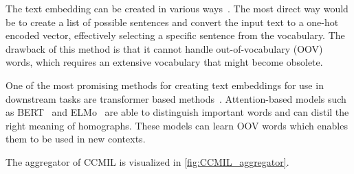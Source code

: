 The text embedding can be created in various ways~\cite{Khattak2019}.
The most direct way would be to create a list of possible sentences and convert the input text to a one-hot encoded vector, effectively selecting a specific sentence from the vocabulary.
The drawback of this method is that it cannot handle out-of-vocabulary (OOV) words, which requires an extensive vocabulary that might become obsolete.

One of the most promising methods for creating text embeddings for use in downstream tasks are transformer based methods~\cite{Vaswani2017}.
Attention-based models such as BERT~\cite{Devlin2018} and ELMo~\cite{Peters2018} are able to distinguish important words and can distil the right meaning of homographs.
These models can learn OOV words which enables them to be used in new contexts.

The aggregator of CCMIL is visualized in \cref{fig:CCMIL_aggregator}.

\begin{figure*}
    \centering
    
    \caption[Clinical Context Multi-Instance Learning aggregator.]{
            Clinical Context Multi-Instance Learning (CCMIL) aggregator.
            Just like in Variance MIL (VarMIL), tile features are presented to a multi-layer perceptron (MLP) to learn attention weights per tile.
            The attention weights are multiplied with their corresponding tile features to get attention-weighted tile features.
            From these, the mean $\mu$ and variance $\sigma^2$ are calculated and concatenated.
            Extending VarMIL, CCMIL further concatenates a text embedding that may contain clinical context of the input image.
            The aggregate is further processed in another MLP for classification.
        }
    \label{fig:CCMIL_aggregator}
\end{figure*}

